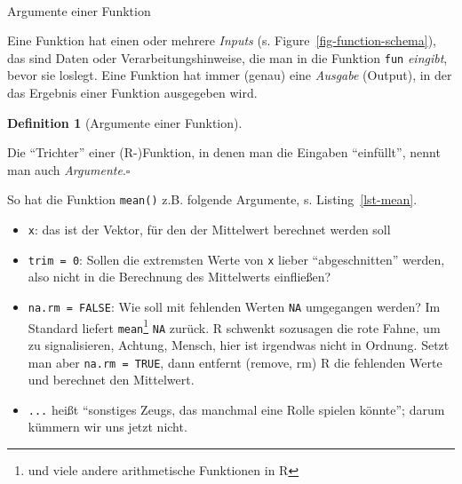 \documentclass[
  letterpaper,
  DIV=11,
  numbers=noendperiod]{scrartcl}
\makeatletter
\let\oldparagraph\paragraph
\renewcommand{\paragraph}{
    \@ifstar
      \xxxParagraphStar
      \xxxParagraphNoStar
  }
\newcommand{\xxxParagraphStar}[1]{\oldparagraph*{#1}\mbox{}}
\newcommand{\xxxParagraphNoStar}[1]{\oldparagraph{#1}\mbox{}}
\newenvironment{Shaded}{\begin{snugshade}}{\end{snugshade}}
\newcommand{\AttributeTok}[1]{\textcolor[rgb]{0.40,0.45,0.13}{#1}}
\newcommand{\ConstantTok}[1]{\textcolor[rgb]{0.56,0.35,0.01}{#1}}
\newcommand{\DecValTok}[1]{\textcolor[rgb]{0.68,0.00,0.00}{#1}}
\newcommand{\FunctionTok}[1]{\textcolor[rgb]{0.28,0.35,0.67}{#1}}
\newcommand{\NormalTok}[1]{\textcolor[rgb]{0.00,0.23,0.31}{#1}}
\providecommand{\tightlist}{%
  \setlength{\itemsep}{0pt}\setlength{\parskip}{0pt}}\usepackage{longtable,booktabs,array}
\theoremstyle{definition}
\theoremstyle{definition}
\theoremstyle{definition}
\newtheorem{definition}{Definition}[section]
\theoremstyle{remark}
\makeatother
\begin{document}
\paragraph{Argumente einer Funktion}\label{argumente-einer-funktion}

Eine Funktion hat einen oder mehrere \emph{Inputs} (s.
Figure~\ref{fig-function-schema}), das sind Daten oder
Verarbeitungshinweise, die man in die Funktion \texttt{fun}
\emph{eingibt}, bevor sie loslegt. Eine Funktion hat immer (genau) eine
\emph{Ausgabe} (Output), in der das Ergebnis einer Funktion ausgegeben
wird.

\begin{definition}[Argumente einer
Funktion]\protect\hypertarget{def-args}{}\label{def-args}

Die ``Trichter'' einer (R-)Funktion, in denen man die Eingaben
``einfüllt'', nennt man auch \emph{Argumente}.\(\square\)

\end{definition}

So hat die Funktion \texttt{mean()} z.B. folgende Argumente, s.
Listing~\ref{lst-mean}.

\begin{codelisting}

\caption{\label{lst-mean}Die Argumente der R-Funktion \texttt{mean}}

\centering{

\begin{Shaded}
\begin{Highlighting}[]
\FunctionTok{mean}\NormalTok{(x, }\AttributeTok{trim =} \DecValTok{0}\NormalTok{, }\AttributeTok{na.rm =} \ConstantTok{FALSE}\NormalTok{, ...)}
\end{Highlighting}
\end{Shaded}

}

\end{codelisting}%

\begin{itemize}
\tightlist
\item
  \texttt{x}: das ist der Vektor, für den der Mittelwert berechnet
  werden soll
\item
  \texttt{trim\ =\ 0}: Sollen die extremsten Werte von \texttt{x} lieber
  ``abgeschnitten'' werden, also nicht in die Berechnung des Mittelwerts
  einfließen?
\item
  \texttt{na.rm\ =\ FALSE}: Wie soll mit fehlenden Werten \texttt{NA}
  umgegangen werden? Im Standard liefert \texttt{mean}\footnote{und
    viele andere arithmetische Funktionen in R} \texttt{NA} zurück. R
  schwenkt sozusagen die rote Fahne, um zu signalisieren, Achtung,
  Mensch, hier ist irgendwas nicht in Ordnung. Setzt man aber
  \texttt{na.rm\ =\ TRUE}, dann entfernt (remove, rm) R die fehlenden
  Werte und berechnet den Mittelwert.
\item
  \texttt{...} heißt ``sonstiges Zeugs, das manchmal eine Rolle spielen
  könnte''; darum kümmern wir uns jetzt nicht.
\end{itemize}
\end{document}
